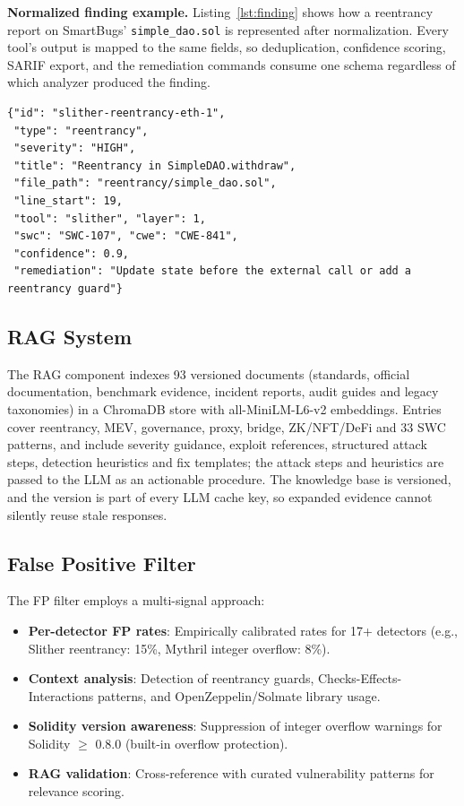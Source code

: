 \documentclass[conference]{IEEEtran}
\begin{document}
\textbf{Normalized finding example.} Listing~\ref{lst:finding} shows how a reentrancy report on SmartBugs' \texttt{simple\_dao.sol} is represented after normalization. Every tool's output is mapped to the same fields, so deduplication, confidence scoring, SARIF export, and the remediation commands consume one schema regardless of which analyzer produced the finding.

\begin{lstlisting}[language={},numbers=none,caption={Normalized MIESC finding (simplified; confidence value illustrative)},label={lst:finding},float=htbp]
{"id": "slither-reentrancy-eth-1",
 "type": "reentrancy",
 "severity": "HIGH",
 "title": "Reentrancy in SimpleDAO.withdraw",
 "file_path": "reentrancy/simple_dao.sol",
 "line_start": 19,
 "tool": "slither", "layer": 1,
 "swc": "SWC-107", "cwe": "CWE-841",
 "confidence": 0.9,
 "remediation": "Update state before the external call or add a reentrancy guard"}
\end{lstlisting}

\subsection{RAG System}
\label{sec:rag}

The RAG component indexes 93 versioned documents (standards, official documentation, benchmark evidence, incident reports, audit guides and legacy taxonomies) in a ChromaDB store with all-MiniLM-L6-v2 embeddings. Entries cover reentrancy, MEV, governance, proxy, bridge, ZK/NFT/DeFi and 33 SWC patterns, and include severity guidance, exploit references, structured attack steps, detection heuristics and fix templates; the attack steps and heuristics are passed to the LLM as an actionable procedure. The knowledge base is versioned, and the version is part of every LLM cache key, so expanded evidence cannot silently reuse stale responses.

\subsection{False Positive Filter}

The FP filter employs a multi-signal approach:
\begin{itemize}
    \item \textbf{Per-detector FP rates}: Empirically calibrated rates for 17+ detectors (e.g., Slither reentrancy: 15\%, Mythril integer overflow: 8\%).
    \item \textbf{Context analysis}: Detection of reentrancy guards, Checks-Effects-Interactions patterns, and OpenZeppelin/Solmate library usage.
    \item \textbf{Solidity version awareness}: Suppression of integer overflow warnings for Solidity $\geq$ 0.8.0 (built-in overflow protection).
    \item \textbf{RAG validation}: Cross-reference with curated vulnerability patterns for relevance scoring.
\end{itemize}
\end{document}
